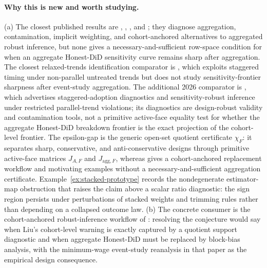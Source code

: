 \documentclass[11pt]{article}
\theoremstyle{definition}
\theoremstyle{plain}
\theoremstyle{remark}
\begin{document}
\paragraph{Why this is new and worth studying.}
(a) The closest published results are \citet{callaway2021multiple}, \citet{sunabraham2021eventstudy}, \citet{wing2024stacked}, and \citet{liu2025cohortanchored}; they diagnose aggregation, contamination, implicit weighting, and cohort-anchored alternatives to aggregated robust inference, but none gives a necessary-and-sufficient row-space condition for when an aggregate Honest-DiD sensitivity curve remains sharp after aggregation.
The closest relaxed-trends identification comparator is \citet{callaway2023nonparallel}, which exploits staggered timing under non-parallel untreated trends but does not study sensitivity-frontier sharpness after event-study aggregation.
The additional 2026 comparator is \citet{wright2026designrobust}, which advertises staggered-adoption diagnostics and sensitivity-robust inference under restricted parallel-trend violations; its diagnostics are design-robust validity and contamination tools, not a primitive active-face equality test for whether the aggregate Honest-DiD breakdown frontier is the exact projection of the cohort-level frontier.
The epsilon-gap is the generic open-set quotient certificate \(\chi_F\): it separates sharp, conservative, and anti-conservative designs through primitive active-face matrices \(J_{A,F}\) and \(J_{\mathrm{agg},F}\), whereas \citet{liu2025cohortanchored} gives a cohort-anchored replacement workflow and motivating examples without a necessary-and-sufficient aggregation certificate.
Example~\ref{ex:stacked-prototype} records the nondegenerate estimator-map obstruction that raises the claim above a scalar ratio diagnostic: the sign region persists under perturbations of stacked weights and trimming rules rather than depending on a collapsed outcome law.
(b) The concrete consumer is the cohort-anchored robust-inference workflow of \citet{liu2025cohortanchored}: resolving the conjecture would say when Liu's cohort-level warning is exactly captured by a quotient support diagnostic and when aggregate Honest-DiD must be replaced by block-bias analysis, with the minimum-wage event-study reanalysis in that paper as the empirical design consequence.
\end{document}
